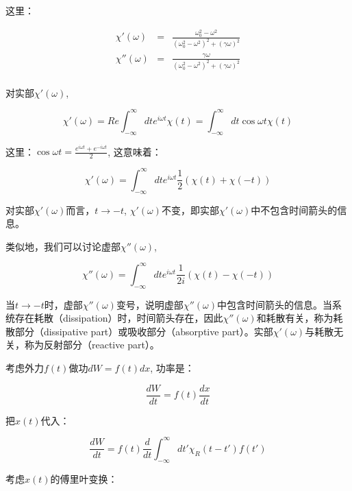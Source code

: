 这里：

\begin{eqnarray}
\chi'(\omega) & = & \frac{\omega_0^2 - \omega^2 }{ (\omega_0^2 - \omega^2 )^2 + (\gamma \omega)^2 }   \\
\chi''(\omega) & = &  \frac{ \gamma \omega  }{ (\omega_0^2 - \omega^2 )^2 + (\gamma \omega)^2 }  \\
\end{eqnarray}

对实部$\chi'(\omega)$,

\begin{equation*}
\chi'(\omega) = Re  \int_{- \infty}^{\infty} dt  { e^{i \omega t} }  \chi(t) = \int_{- \infty}^{\infty} dt \cos {\omega t}  \chi(t)
\end{equation*}

这里：$\cos {\omega t } = \frac{e^{i \omega t}  + e^{- i \omega t} }{2}$, 这意味着：

\begin{equation}
\chi'(\omega) = \int_{- \infty}^{\infty} dt e^{i \omega t} \frac{1}{2} (\chi(t) + \chi(-t))
\end{equation}

对实部$\chi'(\omega)$而言，$ t \to -t $, $\chi'(\omega)$不变，即实部$\chi'(\omega)$中不包含时间箭头的信息。

类似地，我们可以讨论虚部$\chi''(\omega)$,

\begin{equation}
\chi''(\omega) = \int_{-\infty}^{\infty} dt e^{i \omega t } \frac{1}{2i} (\chi(t) - \chi(-t))
\end{equation}

当$t \to -t$时，虚部$\chi''(\omega)$变号，说明虚部$\chi''(\omega)$中包含时间箭头的信息。当系统存在耗散（dissipation）时，时间箭头存在，因此$\chi''(\omega)$和耗散有关，称为耗散部分（dissipative part）或吸收部分（absorptive part）。实部$\chi'(\omega)$与耗散无关，称为反射部分（reactive part）。

考虑外力$f(t)$做功$dW = f(t) dx$, 功率是：

\begin{equation}
\frac{d W}{dt} = f(t) \frac{d x}{dt}
\end{equation}

把$x(t)$代入：

\begin{equation*}
\frac{d W}{dt} = f(t) \frac{d}{dt} \int_{-\infty}^{\infty} dt' \chi_R (t-t') f(t')
\end{equation*}

考虑$x(t)$的傅里叶变换：

